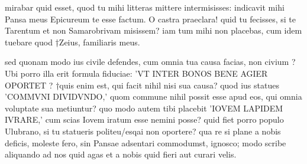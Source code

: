 


 mirabar quid esset, quod tu mihi litteras mittere intermisisses: indicavit mihi Pansa meus Epicureum te esse factum. O castra praeclara! quid tu fecisses, si te Tarentum et non Samarobrivam misissem? iam tum mihi non placebas, cum idem tuebare quod †Zeius, familiaris meus.

 sed quonam modo ius civile defendes, cum omnia tua causa facias, non civium ? Ubi porro illa erit formula fiduciae: 'VT INTER BONOS BENE AGIER OPORTET ? †quis enim est, qui facit nihil nisi sua causa? quod ius statues 'COMMVNI DIVIDVNDO,' quom commune nihil possit esse apud eos, qui omnia voluptate sua metiuntur? quo modo autem tibi placebit 'IOVEM LAPIDEM IVRARE,' cum scias Iovem iratum esse nemini posse? quid fiet porro populo Ulubrano, si tu statueris politeu/esqai non oportere? qua re si plane a nobis deficis, moleste fero, sin Pansae adsentari commodumst, ignosco; modo scribe aliquando ad nos quid agas et a nobis quid fieri aut curari velis.
